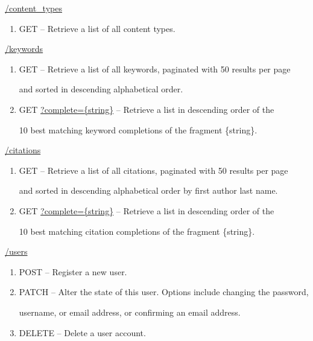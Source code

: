 \documentclass[12pt,letterpaper]{article}
\begin{document}
\begin{myEnumerate}
\begin{myEnumerate}
\begin{myEnumerate}
\item[] \url{/content_types}
\begin{enumerate}
\item[] GET -- Retrieve a list of all content types.
\end{enumerate}
\item[] \url{/keywords}
\begin{enumerate}
\item[] GET -- Retrieve a list of all keywords, paginated with 50 results per page \par and sorted in descending alphabetical order.
\item[] GET \url{?complete={string}} -- Retrieve a list in descending order of the \par 10 best matching keyword completions of the fragment \{string\}.
\end{enumerate}
\item[] \url{/citations}
\begin{enumerate}
\item[] GET -- Retrieve a list of all citations, paginated with 50 results per page \par and sorted in descending alphabetical order by first author last name.
\item[] GET \url{?complete={string}} -- Retrieve a list in descending order of the \par 10 best matching citation completions of the fragment \{string\}.
\end{enumerate}
\end{myEnumerate}
\item[] \url{/users}
\begin{enumerate}
\item[] POST -- Register a new user.
\item[] PATCH -- Alter the state of this user. Options include changing the password, \par username, or email address, or confirming an email address.
\item[] DELETE -- Delete a user account.	%

\end{enumerate}
\end{myEnumerate}
\end{myEnumerate}
\end{document}
